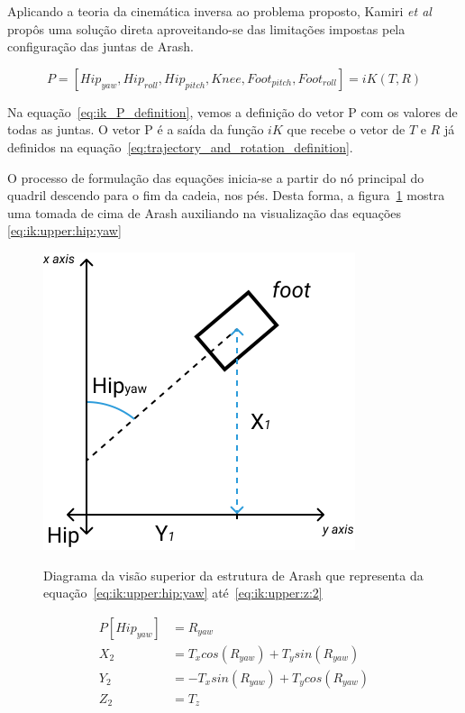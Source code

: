 Aplicando a teoria da cinemática inversa ao problema proposto, Kamiri \textit{et al} propôs uma solução direta aproveitando-se das limitações impostas pela configuração das juntas de Arash.

\begin{equation}
	\label{eq:ik_P_definition}
	P = [Hip_{yaw}, Hip_{roll}, Hip_{pitch}, Knee, Foot_{pitch}, Foot_{roll}] = iK(T, R)
\end{equation}

Na equação~\ref{eq:ik_P_definition}, vemos a definição do vetor P com os valores de todas as juntas. O vetor P é a saída da função $iK$ que recebe o vetor de $T$ e $R$ já definidos na equação~\ref{eq:trajectory_and_rotation_definition}.

O processo de formulação das equações inicia-se a partir do nó principal do quadril descendo para o fim da cadeia, nos pés. Desta forma, a figura~\ref{fig:ik:upperview} mostra uma tomada de cima de Arash auxiliando na visualização das equações \ref{eq:ik:upper:hip:yaw}

\begin{figure}[htb]
	\centering
	\includegraphics[scale=1.5]{imagens/svg/inverse-kinematics-upperview}
	\caption{Diagrama da visão superior da estrutura de Arash que representa da equação~\ref{eq:ik:upper:hip:yaw} até~\ref{eq:ik:upper:z:2}}
	\caption*{\cite{karimionline}}
	\label{fig:ik:upperview}
\end{figure}

\begin{align}
	P[Hip_{yaw}] &= R_{yaw}                             \label{eq:ik:upper:hip:yaw}  \\
	         X_2 &= T_x cos(R_{yaw}) + T_y sin(R_{yaw})  \label{eq:ik:upper:x:2}      \\
	         Y_2 &= -T_x sin(R_{yaw}) + T_ycos(R_{yaw})   \label{eq:ik:upper:y:2}      \\
	         Z_2 &= T_z                                    \label{eq:ik:upper:z:2}
\end{align}

